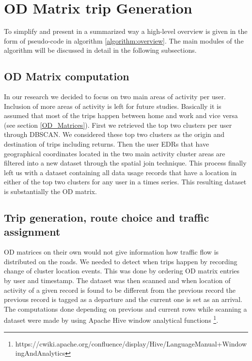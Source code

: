 \documentclass[12pt, a4paper]{report}
\theoremstyle{definition}
\theoremstyle{definition}%
\theoremstyle{definition}%
\theoremstyle{definition}%
\theoremstyle{definition}%
\theoremstyle{definition}%
\begin{document}





\section{OD Matrix trip Generation}  \label{section:odmatrix_trip_generation}

To simplify and present in a summarized way a high-level overview is given in the form of pseudo-code in algorithm \ref{algorithm:overview}. The main modules of the algorithm will be discussed in detail in the following subsections.
 
\subsection{OD Matrix computation}   \label{subsection:odmatrix_computation}
In our research we decided to focus on two main areas of activity per user. Inclusion of more areas of activity is left for future studies. Basically it is assumed that most of the trips happen between home and work and vice versa (see section \ref{OD_Matrices}). First we retrieved the top two clusters per user through DBSCAN. We considered these top two clusters as the origin and destination of trips including returns. Then the user EDRs that have geographical coordinates located in the two main activity cluster areas are filtered into a new dataset through the spatial join technique. This process finally left us with a dataset containing all data usage records that have a location in either of the top two clusters for any user in a times series. This resulting dataset is substantially the OD matrix.

\subsection{Trip generation, route choice and traffic assignment} \label{subsection:trip_generation}

OD matrices on their own would not give information how traffic flow is distributed on the roads. We needed to detect when trips happen by recording change of cluster location events. This was done by ordering OD matrix entries by user and timestamp. The dataset was then scanned and when location of activity of a given record is found to be different from the previous record the previous record is tagged as a departure and the current one is set as an arrival. The computations done depending on previous and current rows while scanning a dataset were made by using Apache Hive window analytical functions \footnote{https://cwiki.apache.org/confluence/display/Hive/LanguageManual+WindowingAndAnalytics}. 
\end{document}
